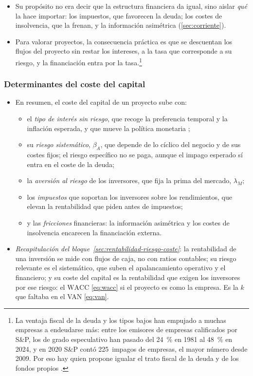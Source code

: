 \documentclass[11pt]{article}
\begin{document}
\begin{itemize}
  \begin{itemize}
  \item Su propósito no era decir que la estructura financiera da igual, sino aislar \emph{qué} la hace importar: los impuestos, que favorecen la deuda; los costes de insolvencia, que la frenan, y la información asimétrica (\ref{sec:corriente}).
  \item Para valorar proyectos, la consecuencia práctica es que se descuentan los flujos del proyecto sin restar los intereses, a la tasa que corresponde a su riesgo, y la financiación entra por la tasa.\footnote{La ventaja fiscal de la deuda y los tipos bajos han empujado a muchas empresas a endeudarse más\nocite{Wigglesworth2020Debt}: entre los emisores de empresas calificados por S\&P, los de grado especulativo han pasado del 24~\% en 1981 al 48~\% en 2024, y en 2020 S\&P contó 225~impagos de empresas, el mayor número desde 2009\nocite{SP2025DefaultStudy}. Por eso hay quien propone igualar el trato fiscal de la deuda y de los fondos propios .}
  \end{itemize}
\end{itemize}

\subsubsection{Determinantes del coste del capital}\label{sec:coste-determinantes}

\begin{itemize}
\item En resumen, el coste del capital de un proyecto sube con:
  \begin{itemize}
  \item el \emph{tipo de interés sin riesgo}, que recoge la preferencia temporal y la inflación esperada, y que mueve la política monetaria ;
  \item su \emph{riesgo sistemático}, $\beta_A$, que depende de lo cíclico del negocio y de sus costes fijos; el riesgo específico no se paga, aunque el impago esperado sí entra en el coste de la deuda;
  \item la \emph{aversión al riesgo} de los inversores, que fija la prima del mercado, $\lambda_M$;
  \item los \emph{impuestos} que soportan los inversores sobre los rendimientos, que elevan la rentabilidad que piden antes de impuestos;
  \item y las \emph{fricciones} financieras: la información asimétrica y los costes de insolvencia encarecen la financiación externa.
  \end{itemize}
\item \emph{Recapitulación del bloque~\ref{sec:rentabilidad-riesgo-coste}}: la rentabilidad de una inversión se mide con flujos de caja, no con ratios contables; su riesgo relevante es el sistemático, que suben el apalancamiento operativo y el financiero; y su coste del capital es la rentabilidad que exigen los inversores por ese riesgo: el $\mathrm{WACC}$ \eqref{eq:wacc} si el proyecto es como la empresa. Es la $k$ que faltaba en el VAN \eqref{eq:van}.
\end{itemize}
\end{document}
